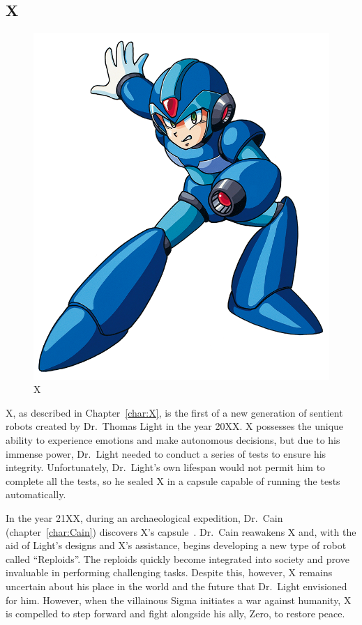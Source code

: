 \subsection{X}
\begin{figure}[htp]
	\centering
	\includegraphics[height=\portraitsize]{figures/X1/X_X1.png}
	\caption{X}
\end{figure}

X, as described in Chapter~\ref{char:X}, is the first of a new generation of sentient robots created by Dr.~Thomas Light in the year 20XX. X possesses the unique ability to experience emotions and make autonomous decisions, but due to his immense power, Dr.~Light needed to conduct a series of tests to ensure his integrity. Unfortunately, Dr.~Light's own lifespan would not permit him to complete all the tests, so he sealed X in a capsule capable of running the tests automatically.

In the year 21XX, during an archaeological expedition, Dr.~Cain (chapter~\ref{char:Cain}) discovers X's capsule~\cite{X:Manual,wiki:Cain_journal}. Dr.~Cain reawakens X and, with the aid of Light's designs and X's assistance, begins developing a new type of robot called ``Reploids''. The reploids quickly become integrated into society and prove invaluable in performing challenging tasks. Despite this, however, X remains uncertain about his place in the world and the future that Dr.~Light envisioned for him. However, when the villainous Sigma initiates a war against humanity, X is compelled to step forward and fight alongside his ally, Zero, to restore peace.

